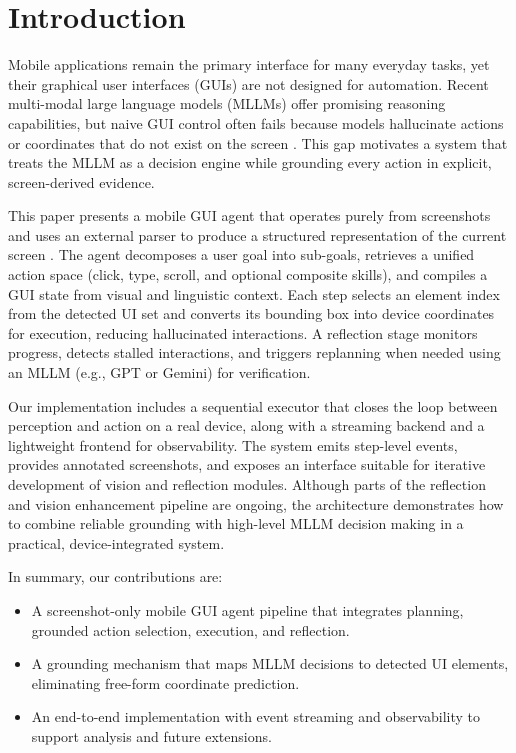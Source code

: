 \section{Introduction}
\label{introduction}

Mobile applications remain the primary interface for many everyday tasks, yet their graphical user interfaces (GUIs) are not designed for automation. Recent multi-modal large language models (MLLMs) offer promising reasoning capabilities, but naive GUI control often fails because models hallucinate actions or coordinates that do not exist on the screen \cite{gao2023assistgui}. This gap motivates a system that treats the MLLM as a decision engine while grounding every action in explicit, screen-derived evidence.

This paper presents a mobile GUI agent that operates purely from screenshots and uses an external parser to produce a structured representation of the current screen \cite{lu2024omniparser}. The agent decomposes a user goal into sub-goals, retrieves a unified action space (click, type, scroll, and optional composite skills), and compiles a GUI state from visual and linguistic context. Each step selects an element index from the detected UI set and converts its bounding box into device coordinates for execution, reducing hallucinated interactions. A reflection stage monitors progress, detects stalled interactions, and triggers replanning when needed using an MLLM (e.g., GPT or Gemini) for verification.

Our implementation includes a sequential executor that closes the loop between perception and action on a real device, along with a streaming backend and a lightweight frontend for observability. The system emits step-level events, provides annotated screenshots, and exposes an interface suitable for iterative development of vision and reflection modules. Although parts of the reflection and vision enhancement pipeline are ongoing, the architecture demonstrates how to combine reliable grounding with high-level MLLM decision making in a practical, device-integrated system.

In summary, our contributions are:
\begin{itemize}
	\item A screenshot-only mobile GUI agent pipeline that integrates planning, grounded action selection, execution, and reflection.
	\item A grounding mechanism that maps MLLM decisions to detected UI elements, eliminating free-form coordinate prediction.
	\item An end-to-end implementation with event streaming and observability to support analysis and future extensions.
\end{itemize}




